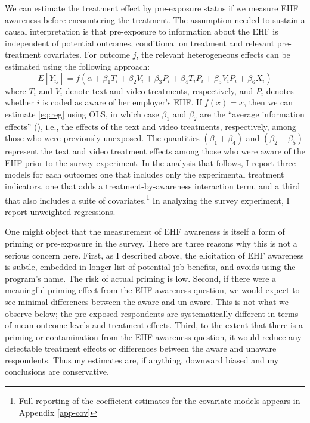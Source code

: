 \documentclass[
  11pt,
  oneside]{article}
\begin{document}
We can estimate the treatment effect by pre-exposure status if we measure EHF awareness before encountering the treatment. The assumption needed to sustain a causal interpretation is that pre-exposure to information about the EHF is independent of potential outcomes, conditional on treatment and relevant pre-treatment covariates. For outcome \(j\), the relevant heterogeneous effects can be estimated using the following approach:
\begin{equation}
E[Y_{ij}] = f(\alpha + \beta_1 T_i + \beta_2 V_i + \beta_3 P_i + \beta_4 T_iP_i + \beta_5 V_iP_i + \beta_6 X_i)
\label{eq:reg}
\end{equation}
where \(T_i\) and \(V_i\) denote text and video treatments, respectively, and \(P_i\) denotes whether \(i\) is coded as aware of her employer's EHF. If \(f(x) = x\), then we can estimate \eqref{eq:reg} using OLS, in which case \(\beta_1\) and \(\beta_2\) are the ``average information effects'' (), i.e., the effects of the text and video treatments, respectively, among those who were previously unexposed. The quantities \((\beta_1+\beta_4)\) and \((\beta_2+\beta_5)\) represent the text and video treatment effects among those who were aware of the EHF prior to the survey experiment. In the analysis that follows, I report three models for each outcome: one that includes only the experimental treatment indicators, one that adds a treatment-by-awareness interaction term, and a third that also includes a suite of covariates.\footnote{Full reporting of the coefficient estimates for the covariate models appears in Appendix \ref{app-cov}} In analyzing the survey experiment, I report unweighted regressions.

One might object that the measurement of EHF awareness is itself a form of priming or pre-exposure in the survey. There are three reasons why this is not a serious concern here. First, as I described above, the elicitation of EHF awareness is subtle, embedded in longer list of potential job benefits, and avoids using the program's name. The risk of actual priming is low. Second, if there were a meaningful priming effect from the EHF awareness question, we would expect to see minimal differences between the aware and un-aware. This is not what we observe below; the pre-exposed respondents are systematically different in terms of mean outcome levels and treatment effects. Third, to the extent that there is a priming or contamination from the EHF awareness question, it would reduce any detectable treatment effects or differences between the aware and unaware respondents. Thus my estimates are, if anything, downward biased and my conclusions are conservative.
\end{document}
